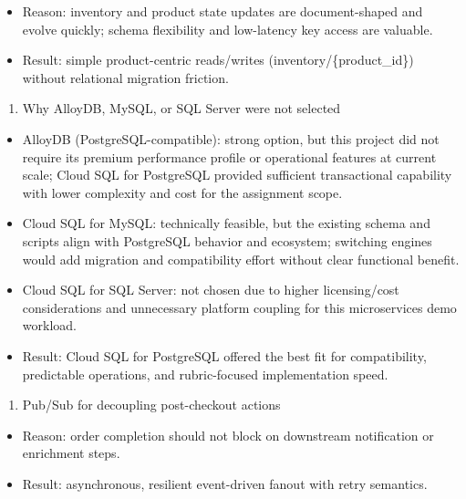 \documentclass[
]{article}
\providecommand{\tightlist}{%
  \setlength{\itemsep}{0pt}\setlength{\parskip}{0pt}}
\begin{document}
\begin{itemize}
\tightlist
\item
  Reason: inventory and product state updates are document-shaped and
  evolve quickly; schema flexibility and low-latency key access are
  valuable.
\item
  Result: simple product-centric reads/writes
  (inventory/\{product\_id\}) without relational migration friction.
\end{itemize}

\begin{enumerate}
\def\labelenumi{\arabic{enumi}.}
\setcounter{enumi}{2}
\tightlist
\item
  Why AlloyDB, MySQL, or SQL Server were not selected
\end{enumerate}

\begin{itemize}
\tightlist
\item
  AlloyDB (PostgreSQL-compatible): strong option, but this project did
  not require its premium performance profile or operational features at
  current scale; Cloud SQL for PostgreSQL provided sufficient
  transactional capability with lower complexity and cost for the
  assignment scope.
\item
  Cloud SQL for MySQL: technically feasible, but the existing schema and
  scripts align with PostgreSQL behavior and ecosystem; switching
  engines would add migration and compatibility effort without clear
  functional benefit.
\item
  Cloud SQL for SQL Server: not chosen due to higher licensing/cost
  considerations and unnecessary platform coupling for this
  microservices demo workload.
\item
  Result: Cloud SQL for PostgreSQL offered the best fit for
  compatibility, predictable operations, and rubric-focused
  implementation speed.
\end{itemize}

\begin{enumerate}
\def\labelenumi{\arabic{enumi}.}
\setcounter{enumi}{3}
\tightlist
\item
  Pub/Sub for decoupling post-checkout actions
\end{enumerate}

\begin{itemize}
\tightlist
\item
  Reason: order completion should not block on downstream notification
  or enrichment steps.
\item
  Result: asynchronous, resilient event-driven fanout with retry
  semantics.
\end{itemize}
\end{document}
